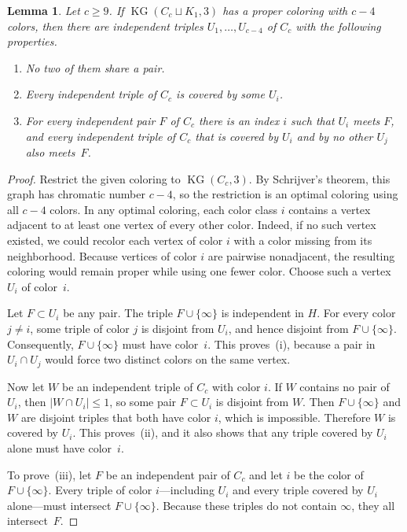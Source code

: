 \documentclass[11pt]{amsart}
\newtheorem{lemma}[theorem]{Lemma}
\theoremstyle{definition}
\theoremstyle{remark}
\numberwithin{equation}{section}
\newcommand{\KG}{\operatorname{KG}}
\begin{document}
\begin{lemma}\label{lem:anchors}
Let $c\ge9$. If $\KG(C_c\sqcup K_1,3)$ has a proper coloring with $c-4$
colors, then there are independent triples $U_1,\dots,U_{c-4}$ of $C_c$ with
the following properties.
\begin{enumerate}
\item[(i)] No two of them share a pair.
\item[(ii)] Every independent triple of $C_c$ is covered by some $U_i$.
\item[(iii)] For every independent pair $F$ of $C_c$ there is an index $i$
such that $U_i$ meets $F$, and every independent triple of $C_c$ that is
covered by $U_i$ and by no other $U_j$ also meets~$F$.
\end{enumerate}
\end{lemma}

\begin{proof}
Restrict the given coloring to $\KG(C_c,3)$. By Schrijver's theorem, this graph
has chromatic number $c-4$, so the restriction is an optimal coloring using all
$c-4$ colors. In any optimal coloring, each color class $i$ contains a vertex
adjacent to at least one vertex of every other color. Indeed, if no such vertex
existed, we could recolor each vertex of color $i$ with a color missing from
its neighborhood. Because vertices of color $i$ are pairwise nonadjacent, the
resulting coloring would remain proper while using one fewer color. Choose such
a vertex $U_i$ of color~$i$.

Let $F\subset U_i$ be any pair. The triple $F\cup\{\infty\}$ is independent in
$H$. For every color $j\ne i$, some triple of color $j$ is disjoint from
$U_i$, and hence disjoint from $F\cup\{\infty\}$. Consequently,
$F\cup\{\infty\}$ must have color~$i$. This proves~(i), because a pair in
$U_i\cap U_j$ would force two distinct colors on the same vertex.

Now let $W$ be an independent triple of $C_c$ with color $i$. If $W$ contains
no pair of $U_i$, then $|W\cap U_i|\le1$, so some pair $F\subset U_i$ is
disjoint from $W$. Then $F\cup\{\infty\}$ and $W$ are disjoint triples that
both have color $i$, which is impossible. Therefore $W$ is covered by $U_i$.
This proves~(ii), and it also shows that any triple covered by $U_i$ alone must
have color~$i$.

To prove~(iii), let $F$ be an independent pair of $C_c$ and let $i$ be the
color of $F\cup\{\infty\}$. Every triple of color $i$---including $U_i$ and
every triple covered by $U_i$ alone---must intersect $F\cup\{\infty\}$. Because
these triples do not contain $\infty$, they all intersect~$F$.
\end{proof}
\end{document}
